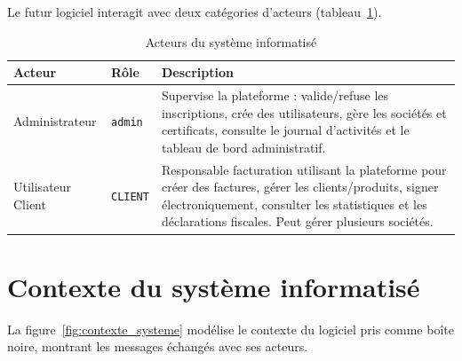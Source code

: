 \documentclass[a4paper,12pt]{report}
\begin{document}
Le futur logiciel interagit avec deux catégories d'acteurs (tableau~\ref{tab:acteurs_systeme}).

\begin{table}[htbp]
\centering
\caption{Acteurs du système informatisé}
\label{tab:acteurs_systeme}
\begin{tabularx}{\textwidth}{|l|l|X|}
\hline
\textbf{Acteur} & \textbf{Rôle} & \textbf{Description} \\
\hline
Administrateur & \texttt{admin} & Supervise la plateforme : valide/refuse les inscriptions, crée des utilisateurs, gère les sociétés et certificats, consulte le journal d'activités et le tableau de bord administratif. \\
\hline
Utilisateur Client & \texttt{CLIENT} & Responsable facturation utilisant la plateforme pour créer des factures, gérer les clients/produits, signer électroniquement, consulter les statistiques et les déclarations fiscales. Peut gérer plusieurs sociétés. \\
\hline
\end{tabularx}
\end{table}

\section{Contexte du système informatisé}

La figure~\ref{fig:contexte_systeme} modélise le contexte du logiciel pris comme boîte noire, montrant les messages échangés avec ses acteurs.
\end{document}
